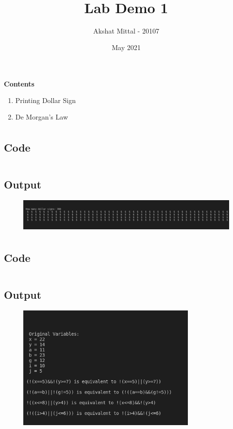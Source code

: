\documentclass[12pt]{article}
\title{Lab Demo 1}
\author{Akshat Mittal - 20107}
\date{May 2021}
\begin{document}
\maketitle
\vspace{7mm}
\textbf{Contents}
\vspace{7mm}
\begin{enumerate}
    \item Printing Dollar Sign
    \item De Morgan's Law
\end{enumerate}
\newpage
\section{}
\subsection{Code}
\inputminted{c}{q1.c}
\subsection{Output}
\begin{figure}[h]
    \centering
    \includegraphics[width=1.0\textwidth]{1.png}
\end{figure}
\newpage
\section{}
\subsection{Code}
\inputminted{c}{q2.c}
\subsection{Output}
\begin{figure}[h]
    \centering
    \includegraphics[width=0.8\textwidth]{2.png}
\end{figure}
\newpage
\end{document}
